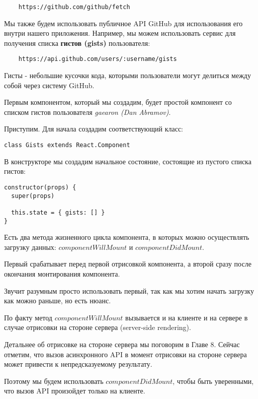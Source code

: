 \begin{lstlisting}
	https://github.com/github/fetch
\end{lstlisting}

Мы также будем использовать публичное API GitHub для использования его внутри нашего приложения. Например, мы можем использовать сервис для получения списка \textbf{гистов (gists)} пользователя:

\begin{lstlisting}
	https://api.github.com/users/:username/gists
\end{lstlisting}

Гисты - небольшие кусочки кода, которыми пользователи могут делиться между собой через систему GitHub.

Первым компонентом, который мы создадим, будет простой компонент со списком гистов пользователя \textit{gaearon (Dan Abramov)}.

Приступим. Для начала создадим соответствующий класс:

\begin{lstlisting}
class Gists extends React.Component
\end{lstlisting}

В конструкторе мы создадим начальное состояние, состоящие из пустого списка гистов:

\begin{lstlisting}
constructor(props) {
  super(props)
  
  this.state = { gists: [] }
}
\end{lstlisting}

Есть два метода жизненного цикла компонента, в которых можно осуществлять загрузку данных: $componentWillMount$ и $componentDidMount$.

Первый срабатывает перед первой отрисовкой компонента, а второй сразу после окончания монтирования компонента.

Звучит разумным просто использовать первый, так как мы хотим начать загрузку как можно раньше, но есть нюанс.

По факту метод $componentWillMount$ вызывается и на клиенте и на сервере в случае отрисовки на стороне сервера (server-side rendering). 

Детальнее об отрисовке на стороне сервера мы поговорим в Главе 8. Сейчас отметим, что вызов асинхронного API в момент отрисовки на стороне сервера может привести к непредсказуемому результату.

Поэтому мы будем использовать $componentDidMount$, чтобы быть уверенными, что вызов API произойдет только на клиенте.

